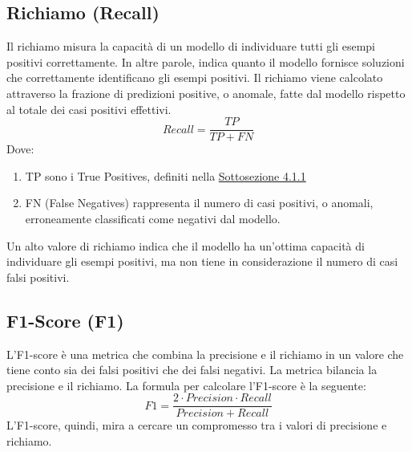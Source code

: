 \subsection{Richiamo (Recall)}
    Il richiamo misura la capacità di un modello di individuare tutti gli esempi positivi correttamente. In altre parole, 
    indica quanto il modello fornisce soluzioni che correttamente identificano gli esempi positivi. Il richiamo 
    viene calcolato attraverso la frazione di predizioni positive, o anomale, fatte 
    dal modello rispetto al totale dei casi positivi effettivi.
    \[Recall = \frac{TP}{TP+FN}\]
    Dove:
    \begin{enumerate}
        \item TP sono i True Positives, definiti nella \hyperref[precision]{Sottosezione 4.1.1}
        \item FN (False Negatives) rappresenta il numero di casi positivi, o anomali, erroneamente classificati come negativi 
              dal modello.
    \end{enumerate}
    Un alto valore di richiamo indica che il modello ha un'ottima capacità di individuare gli esempi positivi, ma 
    non tiene in considerazione il numero di casi falsi positivi.

\subsection{F1-Score (F1)}\label{f1-score}
    L'F1-score è una metrica che combina la precisione e il richiamo in un valore che tiene conto sia dei falsi positivi 
    che dei falsi negativi. La metrica bilancia la precisione e il richiamo. La formula per calcolare l'F1-score è 
    la seguente:
    \[F1 = \frac{2\cdot Precision \cdot Recall}{Precision+Recall}\]
    L'F1-score, quindi, mira a cercare un compromesso tra i valori di precisione e richiamo.

